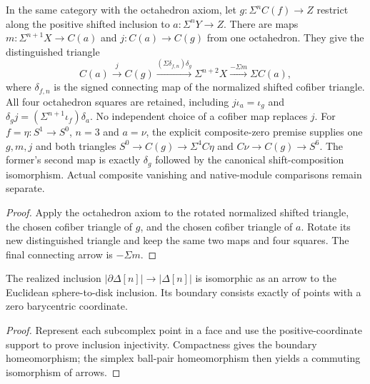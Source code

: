 \begin{proposition}
  \label{prop:cofiber-extension-octahedron}
  \leanok
  In the same category with the octahedron axiom, let
  $g:\Sigma^n C(f)\to Z$ restrict along the positive shifted inclusion
  to $a:\Sigma^nY\to Z$. There are maps
  $m:\Sigma^{n+1}X\to C(a)$ and $j:C(a)\to C(g)$ from one octahedron.
  They give the distinguished triangle
  \[
    C(a)\xrightarrow{j} C(g)
      \xrightarrow{(\Sigma\delta_{f,n})\delta_g}
      \Sigma^{n+2}X\xrightarrow{-\Sigma m}\Sigma C(a),
  \]
  where $\delta_{f,n}$ is the signed connecting map of the normalized
  shifted cofiber triangle. All four octahedron squares are retained,
  including $j\iota_a=\iota_g$ and
  $\delta_gj=(\Sigma^{n+1}\iota_f)\delta_a$.
  No independent choice of a cofiber map replaces $j$.
  For $f=\eta:S^1\to S^0$, $n=3$ and $a=\nu$, the explicit composite-zero
  premise supplies one $g,m,j$ and both triangles
  $S^0\to C(g)\to\Sigma^4C\eta$ and
  $C\nu\to C(g)\to S^6$. The former's second map is exactly
  $\delta_g$ followed by the canonical shift-composition isomorphism.
  Actual composite vanishing and native-module comparisons remain separate.
\end{proposition}
\begin{proof}
  \leanok
  Apply the octahedron axiom to the rotated normalized shifted triangle,
  the chosen cofiber triangle of $g$, and the chosen cofiber triangle of
  $a$. Rotate its new distinguished triangle and keep the same two maps
  and four squares. The final connecting arrow is $-\Sigma m$.
\end{proof}

\begin{proposition}
  \label{prop:realized-simplex-boundary-disk}
  \leanok
  The realized inclusion $|\partial\Delta[n]|\to|\Delta[n]|$ is isomorphic as an arrow to the Euclidean sphere-to-disk inclusion. Its boundary consists exactly of points with a zero barycentric coordinate.
\end{proposition}
\begin{proof}
  Represent each subcomplex point in a face and use the positive-coordinate support to prove inclusion injectivity. Compactness gives the boundary homeomorphism; the simplex ball-pair homeomorphism then yields a commuting isomorphism of arrows.
  \leanok
\end{proof}

